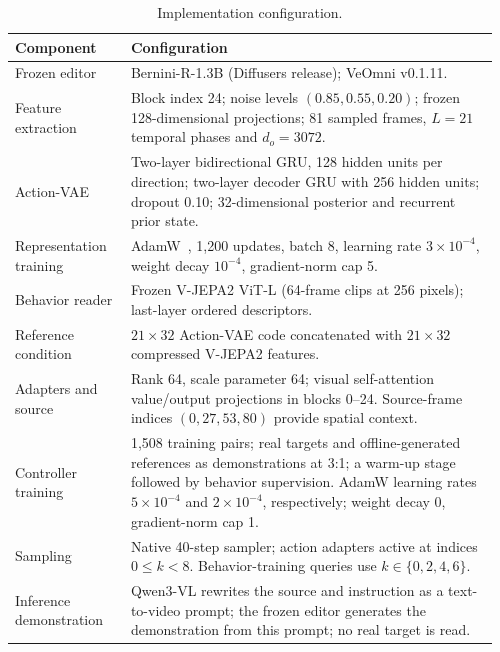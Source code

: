 \begin{table}[!htbp]
 \centering
 \small
 \renewcommand{\arraystretch}{1.15}
 \caption{Implementation configuration.}
 \label{tab:impl-configuration}
 \begin{tabular}{@{}p{0.23\linewidth}p{0.73\linewidth}@{}}
 \hline
 Component & Configuration \\ \hline
 Frozen editor & Bernini-R-1.3B (Diffusers release); VeOmni v0.1.11. \\
 Feature extraction & Block index 24; noise levels $(0.85,0.55,0.20)$;
 frozen 128-dimensional projections; 81 sampled frames,
 $L=21$ temporal phases and $d_o=3072$. \\
 Action-VAE & Two-layer bidirectional GRU, 128 hidden units per direction;
 two-layer decoder GRU with 256 hidden units; dropout 0.10;
 32-dimensional posterior and recurrent prior state. \\
 Representation training & AdamW~\citep{loshchilov2019adamw}, 1,200 updates, batch 8,
 learning rate $3\!\times\!10^{-4}$, weight decay $10^{-4}$,
 gradient-norm cap 5. \\
 Behavior reader & Frozen V-JEPA2 ViT-L (64-frame clips at 256 pixels);
 last-layer ordered descriptors. \\
 Reference condition & $21\!\times\!32$ Action-VAE code concatenated with
 $21\!\times\!32$ compressed V-JEPA2 features. \\
 Adapters and source & Rank 64, scale parameter 64; visual self-attention
 value/output projections in blocks 0--24. Source-frame indices
 $(0,27,53,80)$ provide spatial context. \\
 Controller training & 1,508 training pairs; real targets and offline-generated
 references as demonstrations at 3:1; a warm-up stage followed by
 behavior supervision. AdamW learning rates $5\!\times\!10^{-4}$ and
 $2\!\times\!10^{-4}$, respectively; weight decay 0, gradient-norm cap 1. \\
 Sampling & Native 40-step sampler; action adapters active at indices
 $0\leq k<8$. Behavior-training queries use $k\in\{0,2,4,6\}$. \\
 Inference demonstration & Qwen3-VL rewrites the source and instruction as a
 text-to-video prompt; the frozen editor generates the demonstration from
 this prompt; no real target is read. \\
 \hline
 \end{tabular}
\end{table}

